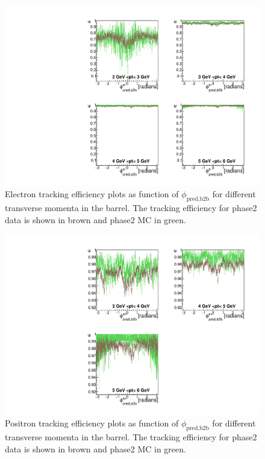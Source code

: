 \documentclass[a4paper,11pt,twosided,final,german,openbib,pdftex,listof=totoc,bibliography=totoc]{scrbook}
\begin{document}
\begin{figure}[!htbp]
	\centering
	\includegraphics[width=\textwidth]{Plots/master/xPtMPhiemBarrel}
	\caption[Transverse Momentum $\phi_{\textrm{pred,b2b}}$ Electron Barrel Efficiency Phase2]{Electron tracking efficiency plots as function of $\phi_{\textrm{pred,b2b}}$ for different transverse momenta in the barrel. The tracking efficiency for phase2 data is shown in brown and phase2 MC in green.
	\label{plt:xPtMPhiemBarrel}	}
\end{figure}

\begin{figure}[!htbp]
	\centering
	\includegraphics[width=\textwidth]{Plots/master/xPtMPhiepBarrel}
	\caption[Transverse Momentum $\phi_{\textrm{pred,b2b}}$ Positron Barrel Efficiency Phase2]{Positron tracking efficiency plots as function of $\phi_{\textrm{pred,b2b}}$ for different transverse momenta in the barrel. The tracking efficiency for phase2 data is shown in brown and phase2 MC in green.
		\label{plt:xPtMPhiepBarrel}	}
\end{figure}
\end{document}
